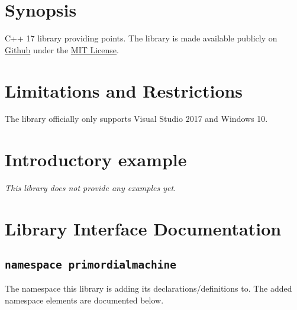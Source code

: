 \documentclass[oneside]{book}
\begin{document}
\frontmatter

\begin{titlepage}
\maketitle
\end{titlepage}

\tableofcontents
{}

\mainmatter

\chapter{Synopsis}
C++ 17 library providing points.
The library is made available publicly on
\href{\GetLibraryRepository}{Github}
under the
\href{\GetLibraryRepository/blob/master/LICENSE}{MIT License}.

\chapter{Limitations and Restrictions}
The library officially only supports Visual Studio 2017 and Windows 10.

\chapter{Introductory example}
\textit{\color{orange}This library does not provide any examples yet.}



\chapter{Library Interface Documentation}

\section{\texttt{namespace primordialmachine}}
The namespace this library is adding its declarations/definitions to.
The added namespace elements are documented below.


\end{document}

